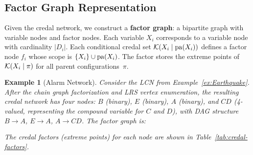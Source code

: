 \documentclass{article}
\newtheorem{example}{Example}
\begin{document}
\subsection{Factor Graph Representation}

Given the credal network, we construct a \textbf{factor graph}: a bipartite graph with variable nodes and factor nodes. Each variable $X_i$ corresponds to a variable node with cardinality $|D_i|$. Each conditional credal set $\mathcal{K}(X_i \mid \mathrm{pa}(X_i))$ defines a factor node $f_i$ whose scope is $\{X_i\} \cup \mathrm{pa}(X_i)$. The factor stores the extreme points of $\mathcal{K}(X_i \mid \pi)$ for all parent configurations~$\pi$.

\begin{example}[Alarm Network]\label{ex:alarm}
Consider the LCN from Example~\ref{ex:Earthquake}. After the chain graph factorization and LRS vertex enumeration, the resulting credal network has four nodes: $B$ (binary), $E$ (binary), $A$ (binary), and $CD$ (4-valued, representing the compound variable for $C$ and $D$), with DAG structure $B \to A$, $E \to A$, $A \to CD$. The factor graph is:

\begin{center}
\end{center}

\noindent The credal factors (extreme points) for each node are shown in Table~\ref{tab:credal-factors}.
\end{example}
\end{document}
